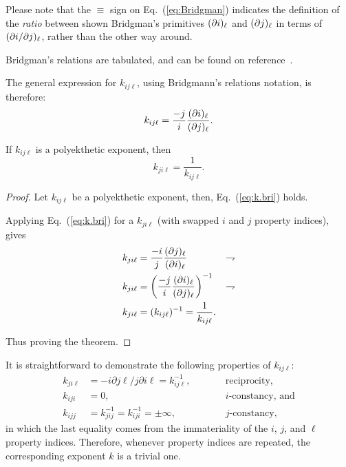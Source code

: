     Please note that the $\equiv$ sign on Eq.~(\ref{eq:Bridgman}) indicates  the  definition  of
    the \emph{ratio} between shown Bridgman's primitives $(\partial {{i}})_{{\ell}}$ and $(\partial {{j}})_{{\ell}}$ in  terms
    of $({\partial {{i}}}/{\partial {{j}}})_{{\ell}}$, rather than the other way around.

    Bridgman's relations are tabulated, and can be found on reference~\cite{2006-BejanA-Wiley}.

    The general expression for $k_{ij\ell}$, using Bridgmann's relations notation, is therefore:
    \begin{equation}
        k_{ij\ell} = \frac{-j}{i}\frac{(\partial {{i}})_{{\ell}}}{(\partial {{j}})_{{\ell}}}.
        \label{eq:k.bri}
    \end{equation}

    \begin{theorem}\label{the:k.recip}
        If $k_{ij\ell}$ is a polyekthetic exponent, then
        \begin{equation}
            k_{ji\ell} = \frac{1}{k_{ij\ell}}.
            \label{eq:k.recipr}
        \end{equation}
    \end{theorem}

    \begin{proof}
        Let $k_{ij\ell}$ be a polyekthetic exponent, then, Eq.~(\ref{eq:k.bri}) holds.

        Applying Eq.~(\ref{eq:k.bri}) for a $k_{ji\ell}$ (with swapped $i$ and $j$ property
        indices), gives
        \begin{align}
            k_{ji\ell} & = \frac{-i}{j}\frac{(\partial {{j}})_{{\ell}}}{(\partial {{i}})_{{\ell}}} 
                       & \rightharpoondown\\
            k_{ji\ell} & = \left(\frac{-j}{i}\frac{(\partial {{i}})_{{\ell}}}{(\partial {{j}})_{{\ell}}}\right)^{-1}
                       & \rightharpoondown\\
            k_{ji\ell} & = (k_{ij\ell})^{-1} = \frac{1}{k_{ij\ell}}.
        \end{align}

        Thus proving the theorem.
    \end{proof}

    It is straightforward to demonstrate the following properties of $k_{ij\ell}$:
    \begin{align}
        \label{eq:polyek.k.recipr}
        k_{ji\ell}  &= -i\partial j\ell / j\partial i\ell = k_{ij\ell}^{-1},    & \qquad & \mbox{reciprocity,} \\
        \label{eq:polyek.k.consti}
        k_{iji}     &= 0,                                                       & \qquad & \mbox{$i$-constancy, and} \\
        \label{eq:polyek.k.constj}
        k_{ijj}     &= k_{jij}^{-1} = k_{iji}^{-1} = \pm\infty,                 & \qquad & \mbox{$j$-constancy},
    \end{align}
    \noindent in which the last equality comes from the  immateriality  of  the  $i$,  $j$,  and
    $\ell$  property  indices.  Therefore,  whenever  property   indices   are   repeated,   the
    corresponding exponent $k$ is a trivial one.

